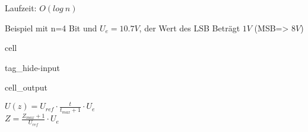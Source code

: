 \documentclass[letterpaper,10pt,english]{jupyterBook}
\begin{document}
\sphinxAtStartPar
Laufzeit: \(O(log~n)\)

\begin{DUlineblock}{0em}
\item[] 
\end{DUlineblock}

\sphinxAtStartPar
Beispiel mit n=4 Bit und \(U_e = 10.7V\), der Wert des LSB Beträgt \(1V\) (MSB=> \(8V\))

\begin{sphinxuseclass}{cell}
\begin{sphinxuseclass}{tag_hide-input}\begin{sphinxVerbatimOutput}

\begin{sphinxuseclass}{cell_output}
\noindent{}

\end{sphinxuseclass}\end{sphinxVerbatimOutput}

\end{sphinxuseclass}
\end{sphinxuseclass}
\begin{DUlineblock}{0em}
\item[] 
\end{DUlineblock}

\sphinxAtStartPar
\(U(z) = U_{ref}\cdot\frac{t}{t_{max} +1}\cdot U_e\)\\
\(Z = \frac{Z_{max} + 1}{U_{ref}} \cdot U_e\)

\begin{DUlineblock}{0em}
\item[] 
\end{DUlineblock}

\begin{DUlineblock}{0em}
\item[] 
\end{DUlineblock}

\sphinxAtStartPar
{}

\sphinxAtStartPar
{}
\end{document}
